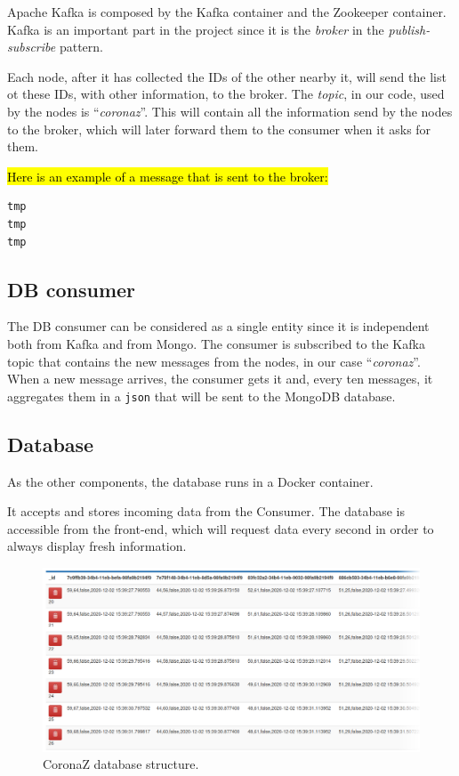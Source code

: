 \documentclass[conference]{IEEEtran}
\begin{document}
		Apache Kafka is composed by the Kafka container and the Zookeeper container.
		Kafka is an important part in the project since it is the \textit{broker} in the \textit{publish-subscribe} pattern.
		
		Each node, after it has collected the IDs of the other nearby it, will send the list ot these IDs, with other information, to the broker.
		The \textit{topic}, in our code, used by the nodes is ``\textit{coronaz}''.
		This will contain all the information send by the nodes to the broker, which will later forward them to the consumer when it asks for them.
		
		\hl{Here is an example of a message that is sent to the broker:}
		\begin{verbatim}
tmp
tmp
tmp
		\end{verbatim}
		
	
	\subsection{DB consumer}
	
		The DB consumer can be considered as a single entity since it is independent both from Kafka and from Mongo.
		The consumer is subscribed to the Kafka topic that contains the new messages from the nodes, in our case ``\textit{coronaz}''.
		When a new message arrives, the consumer gets it and, every ten messages, it aggregates them in a \texttt{json} that will be sent to the MongoDB database.
	
	\subsection{Database}
	
		As the other components, the database runs in a Docker container.
		
		It accepts and stores incoming data from the Consumer.
		The database is accessible from the front-end, which will request data every second in order to always display fresh information.
	
		\begin{figure}[htbp]
			\centerline{\includegraphics[width=\linewidth]{img/database.png}}
			\caption{CoronaZ database structure.}
			\label{fig:database}
		\end{figure}
	
\end{document}
